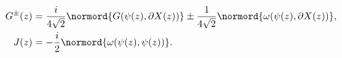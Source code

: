 \begin{equation}
\label{eq:Ntwogens}
\begin{aligned}
  G^{\pm}(z) &= \frac{i}{4\sqrt{2}} \normord{G(\psi(z), \partial
    X(z))} \pm \frac{1}{4\sqrt{2}}
  \normord{\omega(\psi(z), \partial X(z))}, \\
  J(z) &= - \frac{i}{2} \normord{\omega(\psi(z),\psi(z))}.
\end{aligned}
\end{equation}

